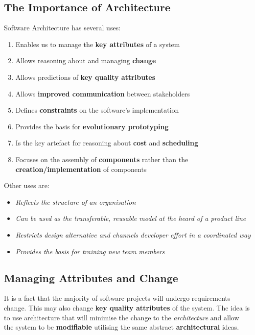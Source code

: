 \documentclass[a4paper]{article}
\begin{document}
\subsection{The Importance of Architecture}
Software Architecture has several uses:
\begin{enumerate}
\item Enables us to manage the \textbf{key attributes} of a system
\item Allows reasoning about and managing \textbf{change}
\item Allows predictions of \textbf{key quality attributes}
\item Allows \textbf{improved communication} between stakeholders
\item Defines \textbf{constraints} on the software's implementation
\item Provides the basis for \textbf{evolutionary prototyping}
\item Is the key artefact for reasoning about \textbf{cost} and \textbf{scheduling}
\item Focuses on the assembly of \textbf{components} rather than the \textbf{creation/implementation} of components\\
\end{enumerate}

Other uses are:
\begin{itemize}
\item \textit{Reflects the structure of an organisation}
\item \textit{Can be used as the transferable, reusable model at the heard of a product line}
\item \textit{Restricts design alternative and channels developer effort in a coordinated way}
\item \textit{Provides the basis for training new team members}
\end{itemize}

\subsection{Managing Attributes and Change}
It is a fact that the majority of software projects will undergo requirements change. This may also change \textbf{key quality attributes} of the system. The idea is to use architecture that will minimise the change to the \textit{architecture} and allow the system to be \textbf{modifiable} utilising the same abstract \textbf{architectural} ideas.\\
\end{document}
